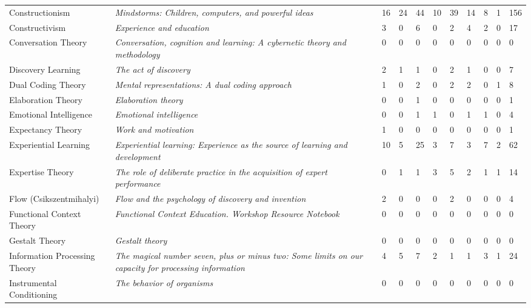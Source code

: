 \begin{table*}[t]
\begin{tabular}{p{3cm}p{5cm}lllllllll}
Constructionism  & \textit{Mindstorms: Children, computers, and powerful ideas}~\cite{papert1980mindstorms} & 16 & 24 & 44 & 10 & 39 & 14 & 8 & 1 & 156\\
Constructivism & \textit{Experience and education}~\cite{dewey1986experience} & 3 & 0 & 6 & 0 & 2 & 4 & 2 & 0 & 17\\
Conversation Theory & \textit{Conversation, cognition and learning: A cybernetic theory and methodology}~\cite{pask1975conversation} & 0 & 0 & 0 & 0 & 0 & 0 & 0 & 0 & 0\\
Discovery Learning & \textit{The act of discovery}~\cite{bruner1961act} & 2 & 1 & 1 & 0 & 2 & 1 & 0 & 0 & 7\\
Dual Coding Theory & \textit{Mental representations: A dual coding approach}~\cite{paivio1990mental} & 1 & 0 & 2 & 0 & 2 & 2 & 0 & 1 & 8\\
Elaboration Theory & \textit{Elaboration theory}~\cite{reigeluth1983elaboration} & 0 & 0 & 1 & 0 & 0 & 0 & 0 & 0 & 1\\
Emotional Intelligence & \textit{Emotional intelligence}~\cite{goleman1995emotional} & 0 & 0 & 1 & 1 & 0 & 1 & 1 & 0 & 4\\
Expectancy Theory & \textit{Work and motivation}~\cite{vroom1964work} & 1 & 0 & 0 & 0 & 0 & 0 & 0 & 0 & 1\\
Experiential Learning & \textit{Experiential learning: Experience as the source of learning and development}~\cite{kolb1984experiential} & 10 & 5 & 25 & 3 & 7 & 3 & 7 & 2 & 62\\
Expertise Theory & \textit{The role of deliberate practice in the acquisition of expert performance}~\cite{ericsson1993role} & 0 & 1 & 1 & 3 & 5 & 2 & 1 & 1 & 14\\
Flow (Csikszentmihalyi) & \textit{Flow and the psychology of discovery and invention}~\cite{csikszentmihalyi1997flow} & 2 & 0 & 0 & 0 & 2 & 0 & 0 & 0 & 4\\
Functional Context Theory & \textit{Functional Context Education. Workshop Resource Notebook}~\cite{sticht1987functional} & 0 & 0 & 0 & 0 & 0 & 0 & 0 & 0 & 0\\
Gestalt Theory & \textit{Gestalt theory}~\cite{wertheimer1938gestalt} & 0 & 0 & 0 & 0 & 0 & 0 & 0 & 0 & 0\\
Information Processing Theory & \textit{The magical number seven, plus or minus two: Some limits on our capacity for processing information}~\cite{miller1956magical} & 4 & 5 & 7 & 2 & 1 & 1 & 3 & 1 & 24\\
Instrumental Conditioning & \textit{The behavior of organisms}~\cite{skinner1938behavior} & 0 & 0 & 0 & 0 & 0 & 0 & 0 & 0 & 0\\

\end{tabular}
\end{table*}
